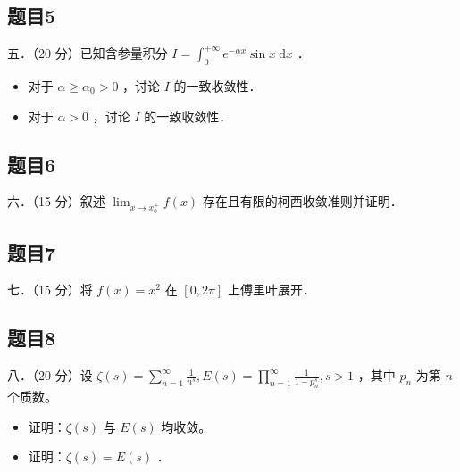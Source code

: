 \documentclass{article}
\begin{document}
\subsection{题目5}
五．（20 分）已知含参量积分 \(I=\int_{0}^{+\infty} e^{-\alpha x} \sin x \mathrm{~d} x\) ．

\begin{itemize}
  \item[（1）] 对于 \(\alpha \geq \alpha_{0}>0\) ，讨论 \(I\) 的一致收敛性．
  \item[（2）] 对于 \(\alpha>0\) ，讨论 \(I\) 的一致收敛性．
\end{itemize}

\subsection{题目6}
六．（15 分）叙述 \(\lim _{x \rightarrow x_{0}^{+}} f(x)\) 存在且有限的柯西收敛准则并证明．

\subsection{题目7}
七．（15 分）将 \(f(x)=x^{2}\) 在 \([0,2 \pi]\) 上傅里叶展开．

\subsection{题目8}
八．（20 分）设 \(\zeta(s)=\sum_{n=1}^{\infty} \frac{1}{n^{s}}, E(s)=\prod_{n=1}^{\infty} \frac{1}{1-p_{n}^{s}}, s>1\) ，其中 \(p_{n}\) 为第 \(n\) 个质数。

\begin{itemize}
  \item[（1）] 证明：\(\zeta(s)\) 与 \(E(s)\) 均收敛。
  \item[（2）] 证明：\(\zeta(s)=E(s)\) ．
\end{itemize}
\end{document}
